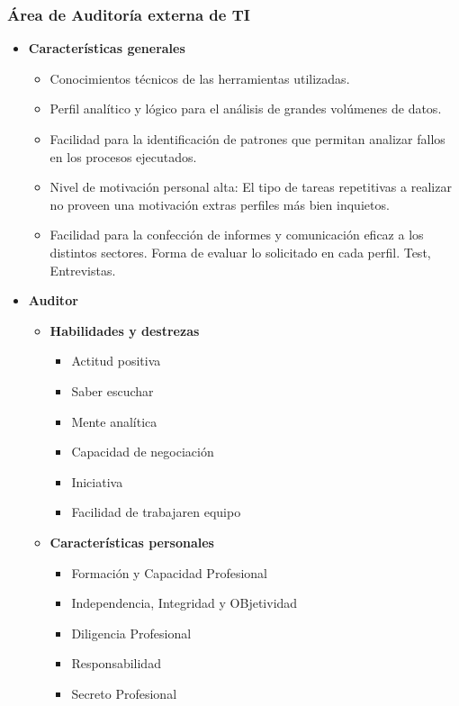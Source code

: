         \subsubsection{Área de Auditoría externa de TI}
            \begin{itemize}
            \item \textbf{Características generales}
                  \begin{itemize}
	                  \item Conocimientos técnicos de las herramientas utilizadas. 
                      \item Perfil analítico y lógico para el análisis de grandes volúmenes de datos. 
                      \item Facilidad para la identificación de patrones que permitan analizar fallos en los procesos ejecutados. 
                      \item  Nivel de motivación personal alta: El tipo de tareas repetitivas a realizar no proveen una motivación extras perfiles más bien inquietos. 
                      \item Facilidad para la confección de informes y comunicación eficaz a los distintos sectores. Forma de evaluar lo solicitado en cada perfil. Test, Entrevistas. 
                  \end{itemize}
           	\item \textbf{Auditor}
            	
                \begin{itemize}
                \item \textbf{Habilidades y destrezas }

                  \begin{itemize}
                      \item Actitud positiva
                       \item Saber escuchar
                       \item Mente analítica
                        \item Capacidad de negociación
                       \item Iniciativa
                       \item Facilidad de trabajaren equipo
                  \end{itemize}
				
                \item \textbf{Características personales}

                    \begin{itemize}
                        \item     Formación y Capacidad Profesional
                        \item    Independencia, Integridad y OBjetividad
                        \item    Diligencia Profesional
                        \item    Responsabilidad
                        \item    Secreto Profesional
                    \end{itemize}



\end{itemize}
\end{itemize}

